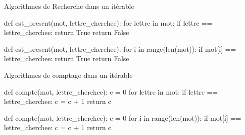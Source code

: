 	
	\begin{easybox}{Algorithmes de Recherche dans un itérable}
	
	\begin{minipage}{0.48\linewidth}
		\begin{CodePythontexAlt}[Largeur=1\linewidth,Centre,PremLigne=1, Lignes=false,]{}
				def est_present(mot, lettre_cherchee):
					for lettre in mot:
						if lettre == lettre_cherchee:
							return True
					return False
				\end{CodePythontexAlt}
		
	\end{minipage}\hfill
	\begin{minipage}{0.48\linewidth}
		\begin{CodePythontexAlt}[Largeur=1\linewidth,Centre,PremLigne=1, Lignes=false,]{}
				def est_present(mot, lettre_cherchee):
					for i in range(len(mot)):
						if mot[i] == lettre_cherchee:
							return True
					return False
				\end{CodePythontexAlt}
		
	\end{minipage}
		
		\end{easybox}

	\begin{easybox}{Algorithmes de comptage dans un itérable}
		
		\begin{minipage}{0.48\linewidth}
			\begin{CodePythontexAlt}[Largeur=1\linewidth,Centre,PremLigne=1, Lignes=false,]{}
			def compte(mot, lettre_cherchee):
				c = 0
				for lettre in mot:
					if lettre == lettre_cherchee:
						c = c + 1
				return c
				
			\end{CodePythontexAlt}
	
		\end{minipage}\hfill
		\begin{minipage}{0.48\linewidth}
		\begin{CodePythontexAlt}[Largeur=1\linewidth,Centre,PremLigne=1, Lignes=false,]{}
			def compte(mot, lettre_cherchee):
				c = 0
				for i in range(len(mot)):
					if mot[i] == lettre_cherchee:
						c = c + 1
				return c
				
			\end{CodePythontexAlt}
	
		\end{minipage}
		

	\end{easybox}

